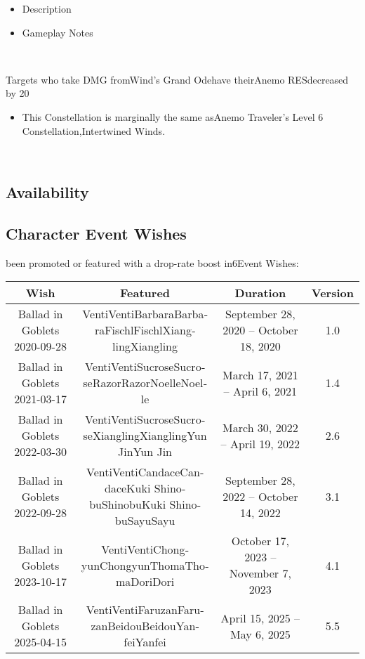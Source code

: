\documentclass[a4paper,12pt]{article}
\begin{document}
\begin{itemize}
\item Description
\item Gameplay Notes
\end{itemize}\\ \par \vspace{0.5cm}

Targets who take DMG fromWind's Grand Odehave theirAnemo RESdecreased by 20%

\begin{itemize}
\item This Constellation is marginally the same asAnemo Traveler's Level 6 Constellation,Intertwined Winds.
\end{itemize}\\ \par \vspace{0.5cm}

\subsection*{Availability}\n\n\subsection*{Character Event Wishes}\n\nVentihas been promoted or featured with a drop-rate boost in6Event Wishes:\\ \par \vspace{0.5cm}

\begin{tabular}{|c|c|c|c|} \hline
Wish & Featured & Duration & Version \\
 \hline
Ballad in Goblets 2020-09-28 & Ven­tiVen­tiBar­ba­raBar­ba­raFis­chlFis­chlXiang­lingXiang­ling & September 28, 2020 – October 18, 2020 & 1.0 \\
Ballad in Goblets 2021-03-17 & Ven­tiVen­tiSu­cro­seSu­cro­seRa­zorRa­zorNo­el­leNo­el­le & March 17, 2021 – April 6, 2021 & 1.4 \\
Ballad in Goblets 2022-03-30 & Ven­tiVen­tiSu­cro­seSu­cro­seXiang­lingXiang­lingYun JinYun Jin & March 30, 2022 – April 19, 2022 & 2.6 \\
Ballad in Goblets 2022-09-28 & Ven­tiVen­tiCan­daceCan­daceKu­ki Shi­no­buShinobuKu­ki Shi­no­buSa­yuSa­yu & September 28, 2022 – October 14, 2022 & 3.1 \\
Ballad in Goblets 2023-10-17 & Ven­tiVen­tiChong­yunChong­yunTho­maTho­maDo­riDo­ri & October 17, 2023 – November 7, 2023 & 4.1 \\
Ballad in Goblets 2025-04-15 & Ven­tiVen­tiFa­ru­zanFa­ru­zanBei­douBei­douYan­feiYan­fei & April 15, 2025 – May 6, 2025 & 5.5 \\
\end{tabular}\\ \par \vspace{0.5cm}
\end{document}
